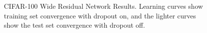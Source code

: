 \documentclass{article}
\begin{document}
\begin{figure}
	\vspace{-5pt}
	\centering
	\noindent\makebox[\textwidth]{\texttt{[image: c100]}}
	\caption{CIFAR-100 Wide Residual Network Results. Learning curves show training set convergence with dropout on, and the lighter curves show the test set convergence with dropout off.}\label{fig:c100}
	\vspace{-5pt}
\end{figure}


\end{document}
